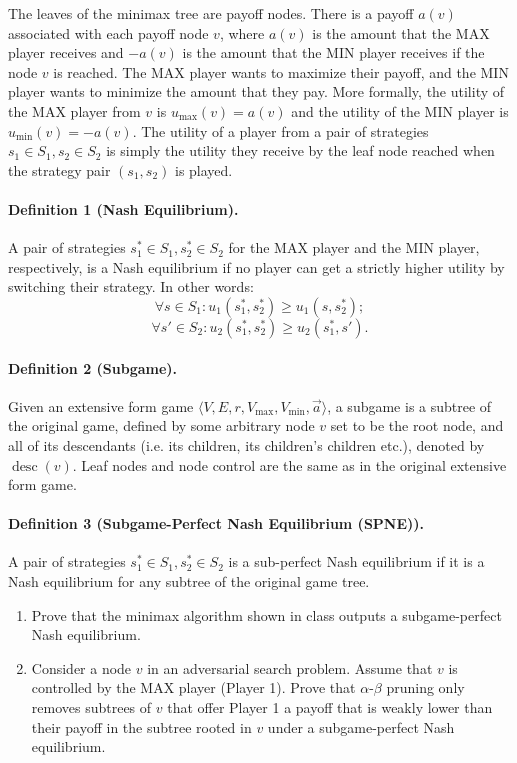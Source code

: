 \documentclass[11pt]{article}
\DeclareMathOperator{\desc}{desc}
\begin{document}
\begin{enumerate}[label=\textbf{\arabic*.}, leftmargin=*]
    The leaves of the minimax tree are payoff nodes. There is a payoff $a(v)$ associated with each payoff node $v$, where $a(v)$ is the amount that the MAX player receives and $-a(v)$ is the amount that the MIN player receives if the node $v$ is reached. The MAX player wants to maximize their payoff, and the MIN player wants to minimize the amount that they pay. More formally, the utility of the MAX player from $v$ is $u_{\max}(v) = a(v)$ and the utility of the MIN player is $u_{\min}(v) = -a(v)$. The utility of a player from a pair of strategies $s_1 \in S_1, s_2 \in S_2$ is simply the utility they receive by the leaf node reached when the strategy pair $(s_1,s_2)$ is played.

    \paragraph{Definition 1 (Nash Equilibrium).} A pair of strategies $s_1^* \in S_1, s_2^* \in S_2$ for the MAX player and the MIN player, respectively, is a Nash equilibrium if no player can get a strictly higher utility by switching their strategy. In other words:
    \[
        \forall s \in S_1 : u_1(s_1^*,s_2^*) \ge u_1(s,s_2^*);
    \]
    \[
        \forall s' \in S_2 : u_2(s_1^*,s_2^*) \ge u_2(s_1^*,s').
    \]

    \paragraph{Definition 2 (Subgame).} Given an extensive form game $\langle V,E,r,V_{\max},V_{\min},\vec{a}\rangle$, a subgame is a subtree of the original game, defined by some arbitrary node $v$ set to be the root node, and all of its descendants (i.e. its children, its children's children etc.), denoted by $\desc(v)$. Leaf nodes and node control are the same as in the original extensive form game.

    \paragraph{Definition 3 (Subgame-Perfect Nash Equilibrium (SPNE)).} A pair of strategies $s_1^* \in S_1, s_2^* \in S_2$ is a sub-perfect Nash equilibrium if it is a Nash equilibrium for any subtree of the original game tree.

    \begin{enumerate}[label=(\alph*)]
        \item Prove that the minimax algorithm shown in class outputs a subgame-perfect Nash equilibrium.
        \item Consider a node $v$ in an adversarial search problem. Assume that $v$ is controlled by the MAX player (Player 1). Prove that $\alpha$-$\beta$ pruning only removes subtrees of $v$ that offer Player 1 a payoff that is weakly lower than their payoff in the subtree rooted in $v$ under a subgame-perfect Nash equilibrium.
    \end{enumerate}
\end{enumerate}
\end{document}
